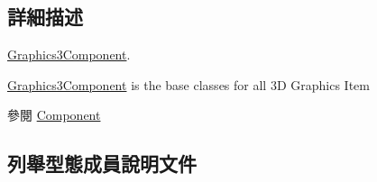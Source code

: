 \subsection{詳細描述}
\hyperlink{class_magnum_1_1_graphics3_component}{Graphics3\+Component}. 

\hyperlink{class_magnum_1_1_graphics3_component}{Graphics3\+Component} is the base classes for all 3D Graphics Item \begin{DoxySeeAlso}{參閱}
\hyperlink{class_magnum_1_1_component}{Component} 
\end{DoxySeeAlso}


\subsection{列舉型態成員說明文件}
